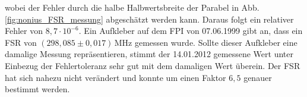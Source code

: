 wobei der Fehler durch die halbe Halbwertsbreite der Parabel in Abb.
\ref{fig:nonius_FSR_messung} abgeschätzt
werden kann. Daraus folgt ein relativer Fehler von $8,7\cdot10^{-6}$. Ein Aufkleber auf dem FPI von
07.06.1999 gibt an, dass ein FSR von $(298,085\pm0,017)\,$MHz gemessen wurde.
Sollte dieser Aufkleber eine damalige Messung repräsentieren, stimmt der
14.01.2012 gemessene Wert unter Einbezug der Fehlertoleranz sehr gut mit dem
damaligen Wert überein. Der FSR hat sich nahezu nicht verändert und konnte um
einen Faktor $6,5$ genauer bestimmt werden.
\begin{figure}[h]
 	\centering
\end{figure}

